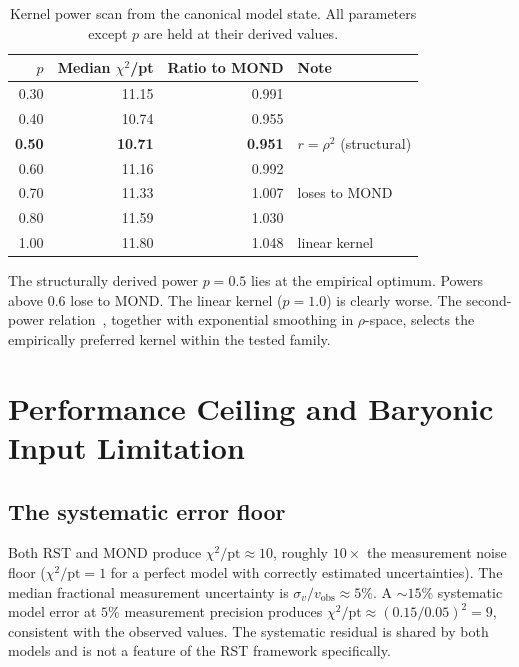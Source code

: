 \documentclass[11pt,a4paper]{article}
\begin{document}
\begin{table}[h]
\centering
\caption{Kernel power scan from the canonical model state. All parameters except $p$ are held at their derived values.}
\label{tab:kernel-scan}
\begin{tabular}{rrrl}
\toprule
$p$ & Median $\chi^2$/pt & Ratio to MOND & Note \\
\midrule
0.30 & 11.15 & 0.991 & \\
0.40 & 10.74 & 0.955 & \\
\textbf{0.50} & \textbf{10.71} & \textbf{0.951} & $r = \rho^2$ (structural) \\
0.60 & 11.16 & 0.992 & \\
0.70 & 11.33 & 1.007 & loses to MOND \\
0.80 & 11.59 & 1.030 & \\
1.00 & 11.80 & 1.048 & linear kernel \\
\bottomrule
\end{tabular}
\end{table}

The structurally derived power $p = 0.5$ lies at the empirical optimum.
Powers above $0.6$ lose to MOND.
The linear kernel ($p = 1.0$) is clearly worse.
The second-power relation~\cite{Wells2026b}, together with exponential smoothing in $\rho$-space, selects the empirically preferred kernel within the tested family.

\section{Performance Ceiling and Baryonic Input Limitation}
\label{sec:ceiling}

\subsection{The systematic error floor}

Both RST and MOND produce $\chi^2/\mathrm{pt} \approx 10$, roughly $10\times$ the measurement noise floor ($\chi^2/\mathrm{pt} = 1$ for a perfect model with correctly estimated uncertainties).
The median fractional measurement uncertainty is $\sigma_v / v_{\mathrm{obs}} \approx 5\%$.
A ${\sim}15\%$ systematic model error at $5\%$ measurement precision produces $\chi^2/\mathrm{pt} \approx (0.15/0.05)^2 = 9$, consistent with the observed values.
The systematic residual is shared by both models and is not a feature of the RST framework specifically.
\end{document}
